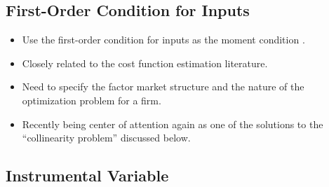 \documentclass[
]{book}
\providecommand{\tightlist}{%
  \setlength{\itemsep}{0pt}\setlength{\parskip}{0pt}}
\begin{document}
\hypertarget{first-order-condition-for-inputs}{%
\subsection{First-Order Condition for Inputs}\label{first-order-condition-for-inputs}}

\begin{itemize}
\tightlist
\item
  Use the first-order condition for inputs as the moment condition \citep{McElroy1987}.
\item
  Closely related to the cost function estimation literature.
\item
  Need to specify the factor market structure and the nature of the optimization problem for a firm.
\item
  Recently being center of attention again as one of the solutions to the ``collinearity problem'' discussed below.
\end{itemize}

\hypertarget{productioniv}{%
\subsection{Instrumental Variable}\label{productioniv}}
\end{document}
